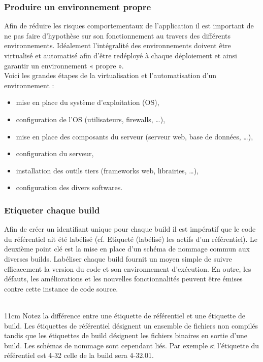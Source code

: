 \documentclass{report}
\begin{document}
        \subsubsection{Produire un environnement propre}
        Afin de réduire les risques comportementaux de l’application il est important de ne pas faire d’hypothèse sur son fonctionnement au travers des différents environnements. Idéalement l’intégralité des environnements doivent être virtualisé et automatisé afin d’être redéployé à chaque déploiement et ainsi garantir un environnement « propre ».\\
        Voici les grandes étapes de la virtualisation et l’automatisation d’un environnement :\\
        \begin{itemize}
          \item mise en place du système d’exploitation (OS),
          \item configuration de l’OS (utilisateurs, firewalls, …),
          \item mise en place des composants du serveur (serveur web, base de données, …),
          \item configuration du serveur,
          \item installation des outils tiers (frameworks web, librairies, …),
          \item	configuration des divers softwares.\\
        \end{itemize}

        \subsubsection{Etiqueter chaque build}
        Afin de créer un identifiant unique pour chaque build il est impératif que le code du référentiel ait été labélisé (cf. Etiqueté (labélisé) les actifs d’un référentiel). Le deuxième point clé est la mise en place d’un schéma de nommage commun aux diverses builds. Labéliser chaque build fournit un moyen simple de suivre efficacement la version du code et son environnement d’exécution. En outre, les défauts, les améliorations et les nouvelles fonctionnalités peuvent être émises contre cette instance de code source.\\\\

        \begin {boxedminipage} {11cm}
          Notez la différence entre une étiquette de référentiel et une étiquette de build. Les étiquettes de référentiel désignent un ensemble de fichiers non compilés tandis que les étiquettes de build désignent les fichiers binaires en sortie d’une build. Les schémas de nommage sont cependant liés. Par exemple si l’étiquette du référentiel est 4-32 celle de la build sera 4-32.01.
        \end {boxedminipage}\\
\end{document}

